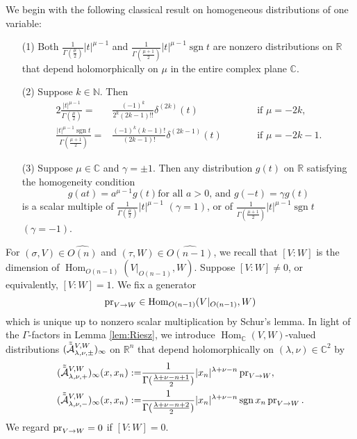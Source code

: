 We begin with the following classical result
 on homogeneous distributions
 of one variable:
\begin{lemma}
\label{lem:Riesz}
\begin{enumerate}
\item[{\rm{(1)}}]
Both $\frac{1}{\Gamma(\frac \mu 2)}|t|^{\mu-1}$
 and $\frac{1}{\Gamma(\frac {\mu+1} 2)}|t|^{\mu-1} \operatorname{sgn} t$
 are nonzero distributions
 on ${\mathbb{R}}$
 that depend holomorphically
 on $\mu$ in the entire complex plane ${\mathbb{C}}$.  
\item[{\rm{(2)}}]
Suppose $k \in {\mathbb{N}}$.  
Then 
\begin{alignat*}{2}
\frac{|t|^{\mu-1}}{\Gamma(\frac \mu 2)}
=&
\frac{(-1)^k}{2^k (2k-1)!!}
\delta^{(2k)}(t)
\qquad
&&\text{if }
\mu=-2k, 
\\
\frac{|t|^{\mu-1}\operatorname{sgn} t}{\Gamma(\frac {\mu+1} 2)}
=&
\frac{(-1)^k(k-1)!}{(2k-1)!}
\delta^{(2k-1)}(t)
\qquad
&&\text{if }
\mu=-2k-1.  
\end{alignat*}
\item[{\rm{(3)}}]
Suppose $\mu \in {\mathbb{C}}$ and $\gamma = \pm 1$.  
Then any distribution $g(t)$ on ${\mathbb{R}}$
 satisfying the homogeneity condition 
\[
  \text{$g(at)=a^{\mu-1}g (t)$
 for all 
 $a >0$, 
 and 
 $g(-t)= \gamma g(t)$
}
\]
 is a scalar multiple
 of $\frac{1}{\Gamma(\frac \mu 2)}|t|^{\mu-1}$ $(\gamma =1)$,
 or of $\frac{1}{\Gamma(\frac {\mu+1} 2)}|t|^{\mu-1} \operatorname{sgn} t$
 $(\gamma =-1)$.  
\end{enumerate}
\end{lemma}

For $(\sigma, V) \in \widehat{O(n)}$ and $(\tau, W) \in \widehat{O(n-1)}$,
 we recall that
$ [V:W] $
is the dimension of
$ 
{\operatorname{Hom}}_{O(n-1)}(V|_{O(n-1)},W)
$.  
Suppose $[V:W] \ne 0$, 
 or equivalently, 
 $[V:W] =1$.  
We fix a generator 
\[
 \operatorname{pr}_{{V}\to{W}} \in \operatorname{Hom}_{O(n-1)}(V|_{O(n-1)},W)
\]
 which is unique
 up to nonzero scalar multiplication
 by Schur's lemma.  
In light of the $\Gamma$-factors in Lemma \ref{lem:Riesz}, 
we introduce $\operatorname{Hom}_{{\mathbb{C}}}(V,W)$-valued distributions 
$
(\tilde{\tilde{{\mathcal{A}}}}_{{\lambda},{\nu},{\pm}}^{{V,W}})_{\infty}
$
 on ${\mathbb{R}}^n$ 
 that depend holomorphically on $(\lambda,\nu) \in {\mathbb{C}}^2$
 by 
\begin{align}
(\tilde{\tilde{{\mathcal{A}}}}_{{\lambda},{\nu},{+}}^{{V,W}})_{\infty}(x,x_n)
:=&
\frac{1}{\Gamma(\frac{\lambda+ \nu-n+1}{2})}|x_n|^{\lambda+\nu-n} \operatorname{pr}_{{V}\to{W}}, 
\label{eqn:AVW+u}
\\
(\tilde{\tilde{{\mathcal{A}}}}_{{\lambda},{\nu},{-}}^{{V,W}})_{\infty}(x,x_n)
:=&
\frac{1}{\Gamma(\frac{\lambda+ \nu-n+2}{2})}|x_n|^{\lambda+\nu-n}
\operatorname{sgn} x_n \operatorname{pr}_{{V}\to{W}}.  
\label{eqn:AVW-u}
\end{align}
We regard $\operatorname{pr}_{{V}\to{W}} =0$
 if $[V:W] = 0$.  

